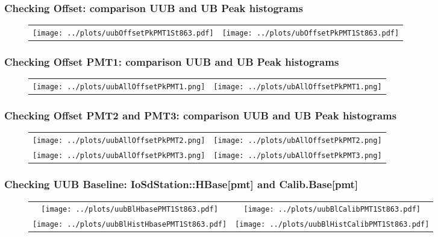 \documentclass[aspectratio=169]{beamer}
\begin{document}

\begin{frame}
	\frametitle{Checking Offset: comparison UUB and UB Peak histograms}
	\begin{figure}
		\centering
		\begin{tabularx}{\textwidth}{CC}
			\texttt{[image: ../plots/uubOffsetPkPMT1St863.pdf]}
			&
			\texttt{[image: ../plots/ubOffsetPkPMT1St863.pdf]}
		\end{tabularx}
	\end{figure}
\end{frame}


\begin{frame}
	\frametitle{Checking Offset PMT1: comparison UUB and UB Peak histograms}
	\begin{figure}
		\centering
		\begin{tabularx}{\textwidth}{CC}
			\texttt{[image: ../plots/uubAllOffsetPkPMT1.png]}
			&
			\texttt{[image: ../plots/ubAllOffsetPkPMT1.png]}
		\end{tabularx}
	\end{figure}
\end{frame}


\begin{frame}
	\frametitle{Checking Offset PMT2 and PMT3: comparison UUB and UB Peak histograms}
	\begin{figure}
		\centering
		\begin{tabularx}{\textwidth}{CC}
			\texttt{[image: ../plots/uubAllOffsetPkPMT2.png]}
			&
			\texttt{[image: ../plots/ubAllOffsetPkPMT2.png]}
			\\
			\texttt{[image: ../plots/uubAllOffsetPkPMT3.png]}
			&
			\texttt{[image: ../plots/ubAllOffsetPkPMT3.png]}
		\end{tabularx}
	\end{figure}
\end{frame}



\begin{frame}
	\frametitle{Checking UUB Baseline: IoSdStation::HBase[pmt] and Calib.Base[pmt]}
	\begin{figure}
		\centering
		\begin{tabularx}{\textwidth}{CC}
			\texttt{[image: ../plots/uubBlHbasePMT1St863.pdf]}
			&
			\texttt{[image: ../plots/uubBlCalibPMT1St863.pdf]}
			\\
			\texttt{[image: ../plots/uubBlHistHbasePMT1St863.pdf]}
			&
			\texttt{[image: ../plots/uubBlHistCalibPMT1St863.pdf]}
		\end{tabularx}
	\end{figure}
\end{frame}
\end{document}
